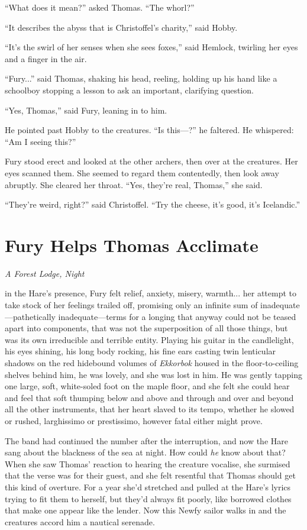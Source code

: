\documentclass[11pt,a5paper]{article}
\newcommand{\alet}[1]{\textit{#1}\vspace{1em}}
\begin{document}
``What does it mean?'' asked Thomas. ``The whorl?''

``It describes the abyss that is Christoffel's charity,'' said Hobby.

``It's the swirl of her senses when she sees foxes,'' said Hemlock, twirling her eyes and a finger in the air.

``Fury...'' said Thomas, shaking his head, reeling, holding up his hand like a schoolboy stopping a lesson to ask an important, clarifying question.

``Yes, Thomas,'' said Fury, leaning in to him.

He pointed past Hobby to the creatures. ``Is this---?'' he faltered. He whispered: ``Am I seeing this?''

Fury stood erect and looked at the other archers, then over at the creatures. Her eyes scanned them. She seemed to regard them contentedly, then look away abruptly. She cleared her throat. ``Yes, they're real, Thomas,'' she said.

``They're weird, right?'' said Christoffel. ``Try the cheese, it's good, it's Icelandic.''

\newpage

\section{Fury Helps Thomas Acclimate}

\alet{A Forest Lodge, Night}

 in the Hare's presence, Fury felt relief, anxiety, misery, warmth... her attempt to take stock of her feelings trailed off, promising only an infinite sum of inadequate---pathetically inadequate---terms for a longing that anyway could not be teased apart into components, that was not the superposition of all those things, but was its own irreducible and terrible entity. Playing his guitar in the candlelight, his eyes shining, his long body rocking, his fine ears casting twin lenticular shadows on the red hidebound volumes of \emph{Ekkorbok} housed in the floor-to-ceiling shelves behind him, he was lovely, and she was lost in him. He was gently tapping one large, soft, white-soled foot on the maple floor, and she felt she could hear and feel that soft thumping below and above and through and over and beyond all the other instruments, that her heart slaved to its tempo, whether he slowed or rushed, larghissimo or prestissimo, however fatal either might prove.

The band had continued the number after the interruption, and now the Hare sang about the blackness of the sea at night. How could \emph{he} know about that? When she saw Thomas' reaction to hearing the creature vocalise, she surmised that the verse was for their guest, and she felt resentful that Thomas should get this kind of overture. For a year she'd stretched and pulled at the Hare's lyrics trying to fit them to herself, but they'd always fit poorly, like borrowed clothes that make one appear like the lender. Now this Newfy sailor walks in and the creatures accord him a nautical serenade.
\end{document}
